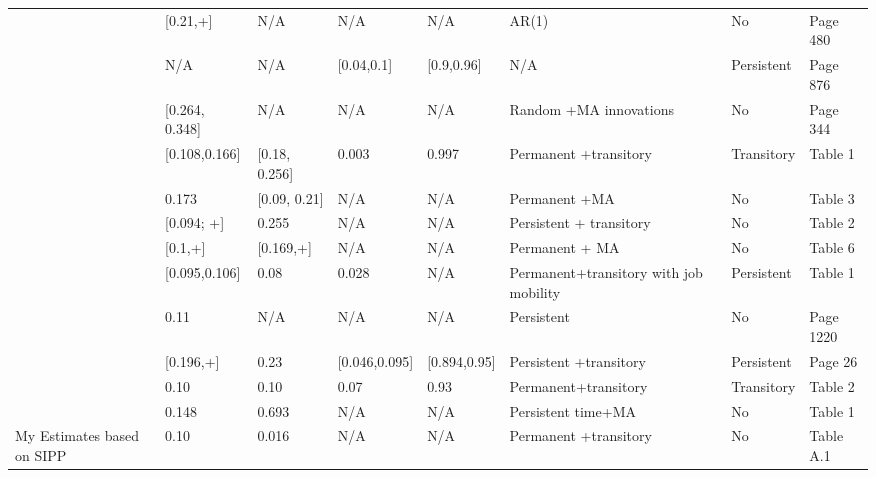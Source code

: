 \begin{sidewaystable}[p]
\begin{adjustbox}{width={\textwidth}}
\begin{threeparttable}
\begin{tabular}{llllllll}
\cite{huggett1996wealth}         & [0.21,+]       & N/A             & N/A           & N/A          & AR(1)                                  & No           & Page 480  \\
\cite{krusell1998income}         & N/A            & N/A             & [0.04,0.1]    & [0.9,0.96]   & N/A                                    & Persistent   & Page 876  \\
\cite{cagetti2003wealth}         & [0.264, 0.348] & N/A             & N/A           & N/A          & Random +MA innovations                 & No           & Page 344  \\
\cite{gourinchas2002consumption} & [0.108,0.166]  & [0.18, 0.256]   & 0.003         & 0.997        & Permanent +transitory                  & Transitory   & Table 1   \\
\cite{meghir2004income}          & 0.173          & [0.09, 0.21]    & N/A           & N/A          & Permanent +MA                          & No           & Table 3   \\
\cite{storesletten2004cyclical}  & [0.094; +]     & 0.255           & N/A           & N/A          & Persistent + transitory                & No           & Table 2   \\
\cite{blundell_consumption_2008} & [0.1,+]        & [0.169,+]       & N/A           & N/A          & Permanent + MA                         & No           & Table 6   \\
\cite{low2010wage}               & [0.095,0.106]  & 0.08            & 0.028         & N/A          & Permanent+transitory with job mobility & Persistent   & Table 1   \\
\cite{kaplan2014model}           & 0.11           & N/A             & N/A           & N/A          & Persistent                             & No           & Page 1220 \\
\cite{krueger2016macroeconomics} & [0.196,+]      & 0.23            & [0.046,0.095] & [0.894,0.95] & Persistent +transitory                 & Persistent   & Page 26   \\
\cite{carroll2017distribution}   & 0.10           & 0.10            & 0.07          & 0.93         & Permanent+transitory                   & Transitory   & Table 2   \\
\cite{bayer2019precautionary}    & 0.148          & 0.693           & N/A           & N/A          & Persistent time+MA                     & No           & Table 1   \\
My Estimates based on SIPP       & 0.10           & 0.016           & N/A           & N/A          & Permanent +transitory                  & No           & Table A.1\\

\end{tabular}
\end{threeparttable}
\end{adjustbox}
\end{sidewaystable}
